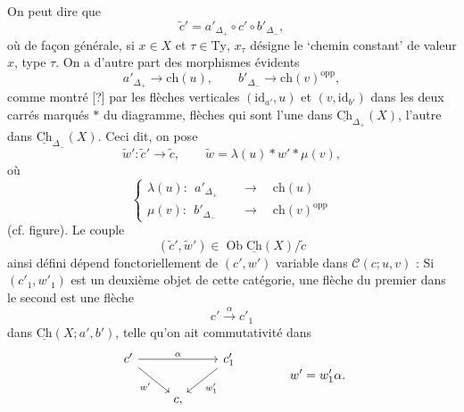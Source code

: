 \documentclass[11pt]{article}
\newcommand{\printedpage}[1]{\marginpar{\footnotesize p.~#1}}
\newcommand{\msp}[1]{\marginpar{\footnotesize [#1]}}
\newcommand{\Ch}{\underline{\mathrm{Ch}}}
\newcommand{\cC}{\mathcal{C}}
\newcommand{\Ob}{\operatorname{Ob}}
\begin{document}
\msp{page 163}
On peut dire que
\[
\tilde{c}' = a'_{\Delta_{+}} \circ c' \circ b'_{\Delta_{-}},
\]
où de façon générale, si $x \in X$ et $\tau \in \mathrm{Ty}$, $x_{\tau}$ désigne le `chemin constant' de valeur $x$, type $\tau$. On a d'autre part des morphismes évidents
\[
a'_{\Delta_{+}} \longrightarrow \mathrm{ch}(u), \qquad b'_{\Delta_{-}} \longrightarrow \mathrm{ch}(v)^{\mathrm{opp}},
\]
comme montré [?] par les flèches verticales $(\mathrm{id}_{a'},u)$ et $(v,\mathrm{id}_{b'})$ dans les deux carrés marqués $\ast$ du diagramme, flèches qui sont l'une dans $\Ch_{\Delta_{+}}(X)$, l'autre dans $\Ch_{\Delta_{-}}(X)$. Ceci dit, on pose
\[
\tilde{w}' : \tilde{c}' \longrightarrow \tilde{c}, \qquad \tilde{w} = \lambda(u) \ast w' \ast \mu(v), %
\]
où
\[
\left\{
\begin{aligned}
\lambda(u) :\ \ a'_{\Delta_{+}} &\quad\longrightarrow\quad \mathrm{ch}(u) \\
\mu(v) :\ \ b'_{\Delta_{-}} &\quad\longrightarrow\quad \mathrm{ch}(v)^{\mathrm{opp}}
\end{aligned}
\right.
\]
\printedpage{102}
(cf. figure). Le couple
\[
(\tilde{c}',\tilde{w}') \in \Ob \Ch(X)/\tilde{c}
\]
ainsi défini dépend fonctoriellement de $(c',w')$ variable dans $\cC(c;u,v)$ : Si $(c'_1,w'_1)$ est un deuxième objet de cette catégorie, une flèche du premier dans le second est une flèche
\[
c' \xrightarrow{\alpha} c'_1
\]
dans $\Ch(X;a',b')$, telle qu'on ait commutativité dans
\[
\begin{tikzcd}
c' \ar[rr,"\alpha"] \ar[dr,"w'"'] & & c'_1 \ar[dl,"w'_1"] \\
& c, &
\end{tikzcd}
\qquad\qquad w' = w'_1\alpha.
\]
\end{document}
